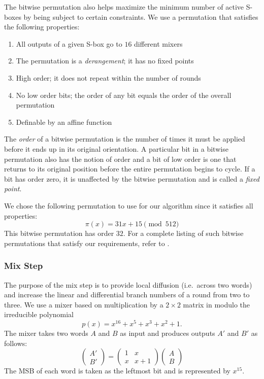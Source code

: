 The bitwise permutation also helps maximize the minimum number of active S-boxes by being subject to certain constraints.
We use a permutation that satisfies the following properties:
\begin{enumerate}
\item All outputs of a given S-box go to $16$ different mixers
\item The permutation is a \emph{derangement}; it has no fixed points
\item High order; it does not repeat within the number of rounds
\item No low order bits; the order of any bit equals the order of the overall permutation
\item Definable by an affine function
\end{enumerate}
The \emph{order} of a bitwise permutation is the number of times it must be applied before it ends up in its original orientation.
A particular bit in a bitwise permutation also has the notion of order and a bit of low order is one that returns to its original position before the entire permutation begins to cycle.
If a bit has order zero, it is unaffected by the bitwise permutation and is called a \emph{fixed point}.

We chose the following permutation to use for our algorithm since it satisfies all properties:
\begin{equation*}
\pi(x) = 31x + 15 \pmod{512}
\end{equation*}
This bitwise permutation has order $32$.
For a complete listing of such bitwise permutations that satisfy our requirements, refer to \cite{Kelly2014_Thesis}.

\subsubsection{Mix Step}
The purpose of the mix step is to provide local diffusion (i.e.\ across two words) and increase the linear and differential branch numbers of a round from two to three.
We use a mixer based on multiplication by a $2 \times 2$ matrix in \gfsixteen modulo the irreducible polynomial
\begin{equation*}
p(x) = x^{16} + x^5 + x^3 + x^2 + 1.
\end{equation*}
The mixer takes two words $A$ and $B$ as input and produces outputs $A'$ and $B'$ as follows:
\begin{equation*}
\begin{pmatrix}
A' \\ B'
\end{pmatrix}
=
\begin{pmatrix}
1 & x \\ x & x + 1
\end{pmatrix}
\begin{pmatrix}
A \\ B
\end{pmatrix}
\end{equation*}
The MSB of each word is taken as the leftmost bit and is represented by $x^{15}$. 

